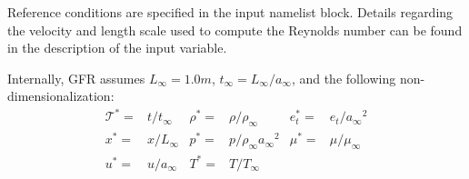 Reference conditions are specified in the 
input namelist block.
%
Details regarding the velocity and length scale used to compute the
Reynolds number can be found in the description of the
 input variable.

\newcommand{\refval}[1]{\ensuremath{#1_\infty}}
\newcommand{\dimval}[1]{\ensuremath{#1}}
\newcommand{\nonval}[1]{\ensuremath{#1^*}}
\newcommand{\taustar}{\ensuremath{\nonval{\scriptstyle \mathcal{T}}}}
\newcommand{\myfrac}[2]{\ensuremath{{#1}/{#2}}}
Internally, GFR assumes
$\refval{L}=1.0\unit{m}$,
$\refval{t}=\refval{L}/\refval{a}$,
and the following non-dimensionalization:
%
\begin{align*}
    \taustar      =& \myfrac{\dimval{t   }}{\refval{t   }}
 &  \nonval{\rho} =& \myfrac{\dimval{\rho}}{\refval{\rho}}
 &  \nonval{e_t}  =& \myfrac{\dimval{e_t }}{\refval{a   }^2}
 \\
    \nonval{x}    =& \myfrac{\dimval{x   }}{\refval{L   }}
 &  \nonval{p}    =& \myfrac{\dimval{p   }}{\refval{\rho}\refval{a}^2}
 &  \nonval{\mu}  =& \myfrac{\dimval{\mu }}{\refval{\mu }}
 \\
    \nonval{u}    =& \myfrac{\dimval{u   }}{\refval{a   }}
 &  \nonval{T}    =& \myfrac{\dimval{T   }}{\refval{T   }}
\end{align*}


